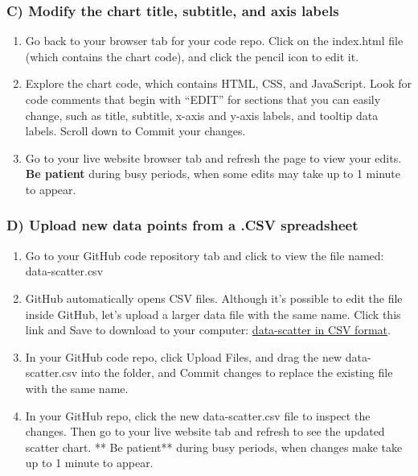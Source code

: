 \documentclass[
  english,
]{book}
\begin{document}
\hypertarget{c-modify-the-chart-title-subtitle-and-axis-labels}{%
\subsubsection*{C) Modify the chart title, subtitle, and axis labels}\label{c-modify-the-chart-title-subtitle-and-axis-labels}}

\begin{enumerate}
\def\labelenumi{\arabic{enumi})}
\setcounter{enumi}{9}
\item
  Go back to your browser tab for your code repo. Click on the index.html file (which contains the chart code), and click the pencil icon to edit it.
\item
  Explore the chart code, which contains HTML, CSS, and JavaScript. Look for code comments that begin with ``EDIT'' for sections that you can easily change, such as title, subtitle, x-axis and y-axis labels, and tooltip data labels. Scroll down to Commit your changes.
\item
  Go to your live website browser tab and refresh the page to view your edits. \textbf{Be patient} during busy periods, when some edits may take up to 1 minute to appear.
\end{enumerate}

\hypertarget{d-upload-new-data-points-from-a-.csv-spreadsheet}{%
\subsubsection*{D) Upload new data points from a .CSV spreadsheet}\label{d-upload-new-data-points-from-a-.csv-spreadsheet}}

\begin{enumerate}
\def\labelenumi{\arabic{enumi})}
\setcounter{enumi}{12}
\item
  Go to your GitHub code repository tab and click to view the file named: data-scatter.csv
\item
  GitHub automatically opens CSV files. Although it's possible to edit the file inside GitHub, let's upload a larger data file with the same name. Click this link and Save to download to your computer: \href{data/data-scatter.csv}{data-scatter in CSV format}.
\item
  In your GitHub code repo, click Upload Files, and drag the new data-scatter.csv into the folder, and Commit changes to replace the existing file with the same name.
\item
  In your GitHub repo, click the new data-scatter.csv file to inspect the changes. Then go to your live website tab and refresh to see the updated scatter chart. ** Be patient** during busy periods, when changes make take up to 1 minute to appear.
\end{enumerate}
\end{document}
